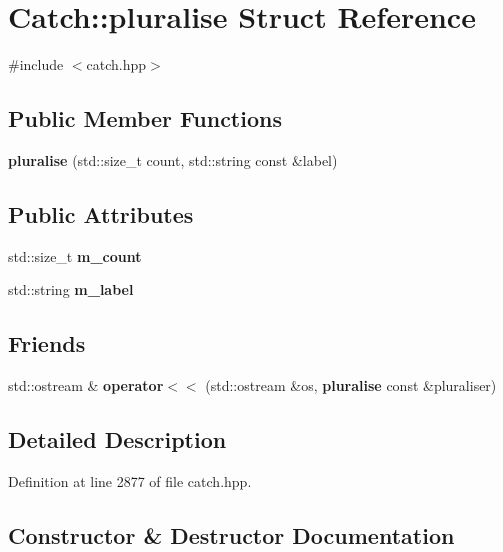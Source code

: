 \section{Catch\+::pluralise Struct Reference}
\label{struct_catch_1_1pluralise}


{\ttfamily \#include $<$catch.\+hpp$>$}

\subsection*{Public Member Functions}
\begin{DoxyCompactItemize}
\item 
\textbf{ pluralise} (std\+::size\+\_\+t count, std\+::string const \&label)
\end{DoxyCompactItemize}
\subsection*{Public Attributes}
\begin{DoxyCompactItemize}
\item 
std\+::size\+\_\+t \textbf{ m\+\_\+count}
\item 
std\+::string \textbf{ m\+\_\+label}
\end{DoxyCompactItemize}
\subsection*{Friends}
\begin{DoxyCompactItemize}
\item 
std\+::ostream \& \textbf{ operator$<$$<$} (std\+::ostream \&os, \textbf{ pluralise} const \&pluraliser)
\end{DoxyCompactItemize}


\subsection{Detailed Description}


Definition at line 2877 of file catch.\+hpp.



\subsection{Constructor \& Destructor Documentation}
\mbox{\label{struct_catch_1_1pluralise_a5c55e22de2416cfe416edf715c6b9234}} 
